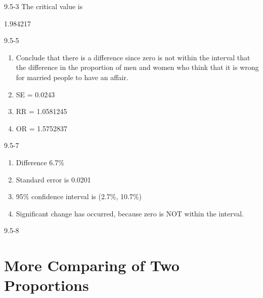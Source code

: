 \begin{exsol@solution}{9.5-3}
   The critical value is


  1.984217

\end{exsol@solution}
\begin{exsol@solution}{9.5-5}



	  \begin{enumerate}
	  \item Conclude that there is a difference since zero is not within the interval that the difference in the proportion of men and women who think that it is wrong for married people to have an affair.
	  \item SE = 0.0243
	  \item RR = 1.0581245
	  \item OR = 1.5752837
	  \end{enumerate}

\end{exsol@solution}
\begin{exsol@solution}{9.5-7}
\begin{enumerate}
\item Difference 6.7\%

\item Standard error is 0.0201
\item  95\% confidence interval is (2.7\%, 10.7\%)

\item Significant change has occurred, because zero is NOT within the interval.

\end{enumerate}

\end{exsol@solution}
\begin{exsol@solution}{9.5-8}
\end{exsol@solution}
\setcounter{chapter}{9}\chapter{More Comparing of Two Proportions}
